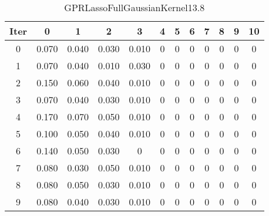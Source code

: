 \begin{table}
	\begin{center}
		\begin{tabular}{|c|c|c|c|c|c|c|c|c|c|c|c|}
			\hline
			Iter & 0 & 1 & 2 & 3 & 4 & 5 & 6 & 7 & 8 & 9 & 10 \\
			\hline
			0 & 0.070 & 0.040 & 0.030 & 0.010 & 0 & 0 & 0 & 0 & 0 & 0 & 0 \\
			\hline
			1 & 0.070 & 0.040 & 0.010 & 0.030 & 0 & 0 & 0 & 0 & 0 & 0 & 0 \\
			\hline
			2 & 0.150 & 0.060 & 0.040 & 0.010 & 0 & 0 & 0 & 0 & 0 & 0 & 0 \\
			\hline
			3 & 0.070 & 0.040 & 0.030 & 0.010 & 0 & 0 & 0 & 0 & 0 & 0 & 0 \\
			\hline
			4 & 0.170 & 0.070 & 0.050 & 0.010 & 0 & 0 & 0 & 0 & 0 & 0 & 0 \\
			\hline
			5 & 0.100 & 0.050 & 0.040 & 0.010 & 0 & 0 & 0 & 0 & 0 & 0 & 0 \\
			\hline
			6 & 0.140 & 0.050 & 0.030 & 0 & 0 & 0 & 0 & 0 & 0 & 0 & 0 \\
			\hline
			7 & 0.080 & 0.030 & 0.050 & 0.010 & 0 & 0 & 0 & 0 & 0 & 0 & 0 \\
			\hline
			8 & 0.080 & 0.050 & 0.030 & 0.010 & 0 & 0 & 0 & 0 & 0 & 0 & 0 \\
			\hline
			9 & 0.080 & 0.040 & 0.030 & 0.010 & 0 & 0 & 0 & 0 & 0 & 0 & 0 \\
			\hline
		\end{tabular}
	\end{center}
	\caption{GPRLassoFullGaussianKernel13.8}
\end{table}